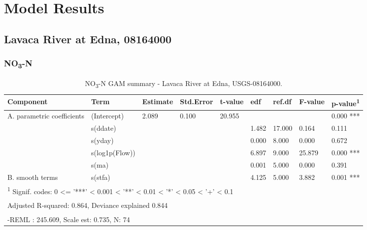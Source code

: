 \documentclass[
]{article}
\newenvironment{widestuff}{\begin{table}[h]\begin{adjustwidth}{-4.5cm}{-4.5cm}\centering}{\end{adjustwidth}\end{table}}
\begin{document}
\hypertarget{model-results}{%
\section{Model Results}\label{model-results}}

\hypertarget{lavaca-river-at-edna-08164000}{%
\subsection{Lavaca River at Edna,
08164000}\label{lavaca-river-at-edna-08164000}}

\hypertarget{no3-n}{%
\subsubsection{\texorpdfstring{NO\textsubscript{3}-N}{NO3-N}}\label{no3-n}}

\begin{widestuff}

\caption{NO\textsubscript{3}-N GAM summary - Lavaca River at Edna, USGS-08164000.}
\centering
\begin{tabular}[t]{lllllllll}
\toprule
Component & Term & Estimate & Std.Error & t-value & edf & ref.df & F-value & p-value\textsuperscript{1}\\
\midrule
A. parametric coefficients & (Intercept) & 2.089 & 0.100 & 20.955 &  &  &  & 0.000 ***\\
\cmidrule{1-9}
 & s(ddate) &  &  &  & 1.482 & 17.000 & 0.164 & 0.111\\

 & s(yday) &  &  &  & 0.000 & 8.000 & 0.000 & 0.672\\

 & s(log1p(Flow)) &  &  &  & 6.897 & 9.000 & 25.879 & 0.000 ***\\

 & s(ma) &  &  &  & 0.001 & 5.000 & 0.000 & 0.391\\

\multirow[t]{-5}{*}{\raggedright\arraybackslash B. smooth terms} & s(stfa) &  &  &  & 4.125 & 5.000 & 3.882 & 0.001 ***\\
\bottomrule
\multicolumn{9}{l}{\textsuperscript{1} Signif. codes: 0 <= '***' < 0.001 < '**' < 0.01 < '*' < 0.05 < '+' < 0.1}\\
\multicolumn{9}{l}{\textsuperscript{} Adjusted R-squared: 0.864, Deviance explained 0.844}\\
\multicolumn{9}{l}{\textsuperscript{} -REML : 245.609, Scale est: 0.735, N: 74}\\
\end{tabular}
\end{widestuff}
\end{document}
